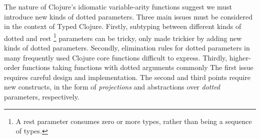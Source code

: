 The nature of Clojure's idiomatic variable-arity functions suggest we must introduce
new kinds of dotted parameters. Three main issues must be considered in the context of Typed Clojure.
Firstly, subtyping between different kinds of dotted and rest
\footnote{A rest parameter consumes zero or more types, rather than being a sequence of types.}
parameters can be tricky, only made trickier by adding new kinds of dotted parameters.
Secondly, elimination rules for dotted parameters in many frequently used Clojure core functions
difficult to express.
Thirdly, higher-order functions taking functions with dotted arguments commonly 
The first issue requires careful design and implementation.
The second and third points require new constructs, in the form of \emph{projections}
and abstractions over \emph{dotted} parameters, respectively.



